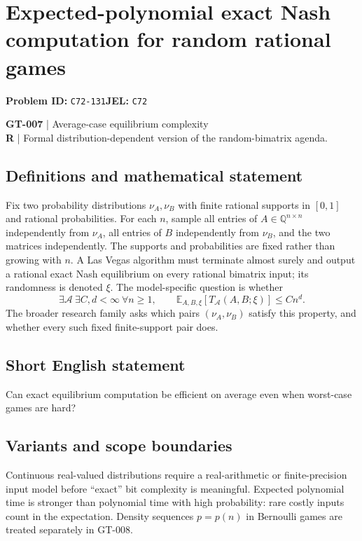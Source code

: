 \documentclass[11pt,a4paper]{article}
\begin{document}
\section*{Expected-polynomial exact Nash computation for random rational games}
\textbf{Problem ID:} \texttt{C72-131}\quad \textbf{JEL:} \texttt{C72}\par
\label{problem:OP-0137}
\label{game:GT-007}
{\sffamily\small\color{muted}
\textbf{GT-007} | Average-case equilibrium complexity\\
\textbf{R} | Formal distribution-dependent version of the random-bimatrix agenda.
\par}
\subsection*{Definitions and mathematical statement}
Fix two probability distributions $\nu_A,\nu_B$ with finite rational supports in $[0,1]$ and rational probabilities. For each $n$, sample all entries of $A\in\mathbb Q^{n\times n}$ independently from $\nu_A$, all entries of $B$ independently from $\nu_B$, and the two matrices independently. The supports and probabilities are fixed rather than growing with $n$. A Las Vegas algorithm must terminate almost surely and output a rational exact Nash equilibrium on every rational bimatrix input; its randomness is denoted $\xi$.
The model-specific question is whether
\[
 \exists\mathcal A\ \exists C,d<\infty\ \forall n\geq1,\qquad
 \mathbb E_{A,B,\xi}[T_{\mathcal A}(A,B;\xi)]\leq Cn^d.
\]
The broader research family asks which pairs $(\nu_A,\nu_B)$ satisfy this property, and whether every such fixed finite-support pair does.
\subsection*{Short English statement}
Can exact equilibrium computation be efficient on average even when worst-case games are hard?
\subsection*{Variants and scope boundaries}
Continuous real-valued distributions require a real-arithmetic or finite-precision input model before ``exact'' bit complexity is meaningful. Expected polynomial time is stronger than polynomial time with high probability: rare costly inputs count in the expectation. Density sequences $p=p(n)$ in Bernoulli games are treated separately in GT-008.
\end{document}
